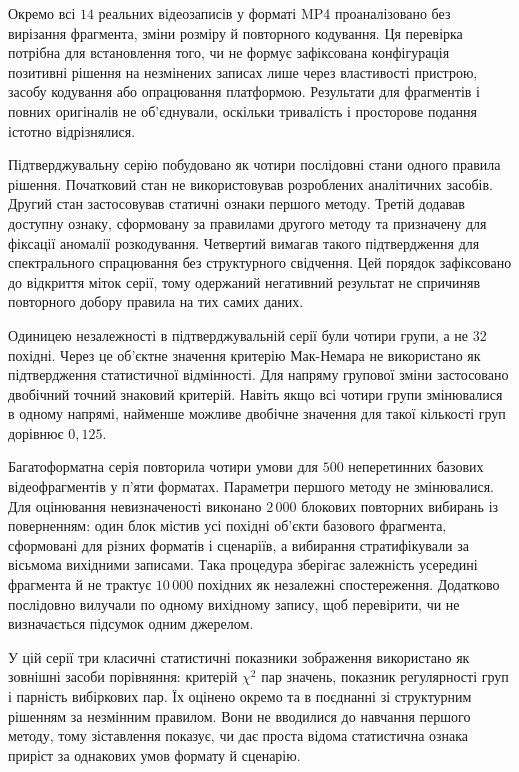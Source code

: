 Окремо всі $14$ реальних відеозаписів у форматі MP4 проаналізовано без вирізання фрагмента, зміни розміру й повторного кодування. Ця перевірка потрібна для встановлення того, чи не формує зафіксована конфігурація позитивні рішення на незмінених записах лише через властивості пристрою, засобу кодування або опрацювання платформою. Результати для фрагментів і повних оригіналів не об’єднували, оскільки тривалість і просторове подання істотно відрізнялися.

Підтверджувальну серію побудовано як чотири послідовні стани одного правила рішення. Початковий стан не використовував розроблених аналітичних засобів. Другий стан застосовував статичні ознаки першого методу. Третій додавав доступну ознаку, сформовану за правилами другого методу та призначену для фіксації аномалії розкодування. Четвертий вимагав такого підтвердження для спектрального спрацювання без структурного свідчення. Цей порядок зафіксовано до відкриття міток серії, тому одержаний негативний результат не спричиняв повторного добору правила на тих самих даних.

Одиницею незалежності в підтверджувальній серії були чотири групи, а не $32$ похідні. Через це об’єктне значення критерію Мак-Немара не використано як підтвердження статистичної відмінності. Для напряму групової зміни застосовано двобічний точний знаковий критерій. Навіть якщо всі чотири групи змінювалися в одному напрямі, найменше можливе двобічне значення для такої кількості груп дорівнює $0{,}125$.

Багатоформатна серія повторила чотири умови для $500$ неперетинних базових відеофрагментів у п’яти форматах. Параметри першого методу не змінювалися. Для оцінювання невизначеності виконано $2\,000$ блокових повторних вибирань із поверненням: один блок містив усі похідні об’єкти базового фрагмента, сформовані для різних форматів і сценаріїв, а вибирання стратифікували за вісьмома вихідними записами. Така процедура зберігає залежність усередині фрагмента й не трактує $10\,000$ похідних як незалежні спостереження. Додатково послідовно вилучали по одному вихідному запису, щоб перевірити, чи не визначається підсумок одним джерелом.

У цій серії три класичні статистичні показники зображення використано як зовнішні засоби порівняння: критерій $\chi^2$ пар значень, показник регулярності груп і парність вибіркових пар. Їх оцінено окремо та в поєднанні зі структурним рішенням за незмінним правилом. Вони не вводилися до навчання першого методу, тому зіставлення показує, чи дає проста відома статистична ознака приріст за однакових умов формату й сценарію.

